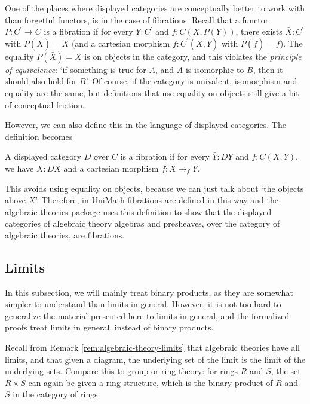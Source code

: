 One of the places where displayed categories are conceptually better to work with than forgetful functors, is in the case of fibrations. Recall that a functor $ P: C^\prime \to C $ is a fibration if for every $ Y : C^\prime $ and $ f : C(X, P(Y)) $, there exists $ \bar X : C^\prime $ with $ P(\bar X) = X $ (and a cartesian morphism $ \bar f : C^\prime(\bar X, Y) $ with $ P(\bar f) = f $). The equality $ P(\bar X) = X $ is on objects in the category, and this violates the \textit{principle of equivalence}: `if something is true for $ A $, and $ A $ is isomorphic to $ B $, then it should also hold for $ B $'. Of course, if the category is univalent, isomorphism and equality are the same, but definitions that use equality on objects still give a bit of conceptual friction.

However, we can also define this in the language of displayed categories. The definition becomes
\begin{definition}
  A displayed category $ D $ over $ C $ is a fibration if for every $ \bar Y : D Y $ and $ f: C(X, Y) $, we have $ \bar X : D X $ and a cartesian morphism $ \bar f : \bar X \to_f \bar Y $.
\end{definition}
This avoids using equality on objects, because we can just talk about `the objects above $ X $'. Therefore, in UniMath fibrations are defined in this way and the algebraic theories package uses this definition to show that the displayed categories of algebraic theory algebras and presheaves, over the category of algebraic theories, are fibrations.

\subsection{Limits}
In this subsection, we will mainly treat binary products, as they are somewhat simpler to understand than limits in general. However, it is not too hard to generalize the material presented here to limits in general, and the formalized proofs treat limits in general, instead of binary products.

Recall from Remark \ref{rem:algebraic-theory-limits} that algebraic theories have all limits, and that given a diagram, the underlying set of the limit is the limit of the underlying sets. Compare this to group or ring theory: for rings $ R $ and $ S $, the set $ R \times S $ can again be given a ring structure, which is the binary product of $ R $ and $ S $ in the category of rings.

